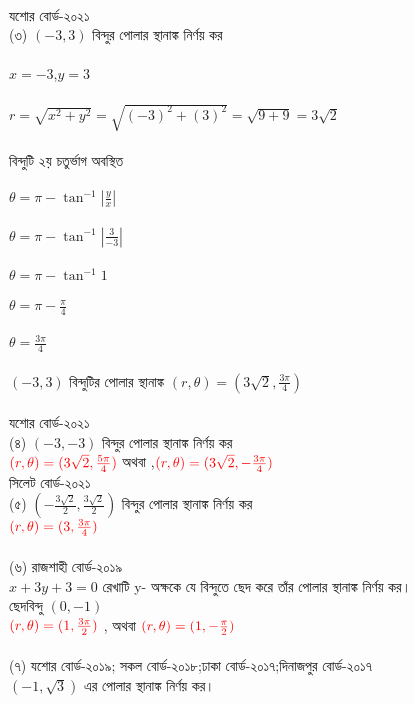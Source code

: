 \documentclass{article}
\begin{document}
	\\
	যশোর বোর্ড-২০২১\\
(৩)	$(-3,3)$ বিন্দুর পোলার স্থানাঙ্ক নির্ণয় কর\\
	\\
	$x=-3$,\qquad  $y=3$\\
	\\
	$r=\sqrt{x^2+y^2}=\sqrt{(-3)^2+(3)^2}=\sqrt{9+9}=3\sqrt{2}$\\
	\\
	বিন্দুটি ২য় চতুর্ভাগ অবস্থিত\\
	\\ 
	$\theta= \pi - \tan^{-1}|\frac{y}{x}|$\\
	\\
	$\theta= \pi - \tan^{-1}|\frac{3}{-3}|$\\
	\\
	$\theta= \pi - \tan^{-1}1$\\
	\\
	$\theta= \pi - \frac{\pi}{4}$\\
	\\
	$\theta=\frac{3\pi}{4}$\\
	\\
	$(-3,3)$	বিন্দুটির পোলার স্থানাঙ্ক $(r,\theta)=(3\sqrt{2},\frac{3\pi}{4})$\\
	\\
	যশোর বোর্ড-২০২১\\
	(৪) $(-3,-3)$ বিন্দুর পোলার স্থানাঙ্ক নির্ণয় কর\\
	$\textcolor{red}{(r,\theta)=(3\sqrt{2},\frac{5\pi}{4})}$ অথবা ,\qquad $\textcolor{red}{(r,\theta)=(3\sqrt{2},-\frac{3\pi}{4})}$
	\\
	সিলেট বোর্ড-২০২১\\
(৫)	$(-\frac{3\sqrt{2}}{2},\frac{3\sqrt{2}}{2})$ বিন্দুর পোলার স্থানাঙ্ক নির্ণয় কর\\
	$\textcolor{red}{(r,\theta)=(3,\frac{3\pi}{4})}$\\
	\\
		(৬) রাজশাহী বোর্ড-২০১৯\\
	$x+3y+3=0$ রেখাটি y- অক্ষকে যে বিন্দুতে ছেদ করে তাঁর পোলার স্থানাঙ্ক নির্ণয় কর। \\
	ছেদবিন্দু $(0,-1)$\\ 
	$\textcolor{red}{(r,\theta)=(1,\frac{3\pi}{2})}$ , অথবা	$\textcolor{red}{(r,\theta)=(1,-\frac{\pi}{2})}$\\ 
	\\
	(৭) যশোর বোর্ড-২০১৯; সকল বোর্ড-২০১৮;ঢাকা বোর্ড-২০১৭;দিনাজপুর বোর্ড-২০১৭\\
	$(-1,\sqrt{3})$ এর পোলার স্থানাঙ্ক নির্ণয় কর। \\
\end{document}

